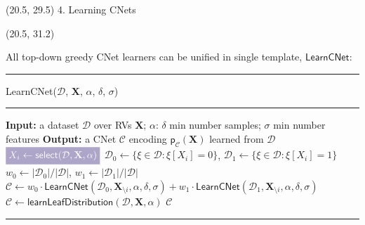 \documentclass[final]{beamer}
\newcommand{\highlight}[2][yellow]{\mathchoice%
  {\colorbox{#1}{\strut\textcolor{white}{$\displaystyle{#2}$}}}%
  {\colorbox{#1}{\strut\textcolor{white}{$\textstyle{#2}$}}}%
  {\colorbox{#1}{\strut\textcolor{white}{$\scriptstyle{#2}$}}}%
  {\colorbox{#1}{\strut\textcolor{white}{$\scriptscriptstyle{#2}$}}}}%
\begin{document}
\begin{frame}{}
  \begin{textblock}{17.5}(20.5, 29.5)
    4. Learning CNets
  \end{textblock}
  
  \begin{textblock}{17.5}(20.5, 31.2)
    \small
    
    All top-down greedy CNet learners %
    can be unified in single template, $\mathsf{LearnCNet}$:
 \begin{center}  
  \begin{minipage}{0.9\linewidth}
    \vspace{10pt}
        \scriptsize
        {\hrule\flushleft\textsf{LearnCNet}($\mathcal{D}$, $\mathbf{X}$, $\alpha$,
        $\delta$, $\sigma$)\\\hrule}
  \begin{algorithmic}[1]
    \State \textbf{Input:} a dataset $\mathcal{D}$ over RVs $\mathbf{X}$; $\alpha$: $\delta$
    min number samples; $\sigma$ min number features
    \State  \textbf{Output:}  a CNet $\mathcal{C}$ encoding  $\mathsf{p}_{\mathcal{C}}(\textbf{X})$ learned from $\mathcal D$
    \State $\highlight[lacamlightlilac]{X_i\leftarrow  \mathsf{select}(\mathcal D, \mathbf X, \alpha)}$
    \State $\mathcal D_0 \leftarrow \{\xi \in \mathcal D: \xi[X_i]=0 \}$, $\mathcal D_1 \leftarrow \{\xi \in \mathcal D: \xi[X_i]=1 \}$
    \State $w_0 \leftarrow |\mathcal D_0| / |\mathcal D|$, $w_1 \leftarrow |\mathcal   D_1| / |\mathcal D|$
    \State $\mathcal{C} \leftarrow
    w_0\cdot\mathsf{LearnCNet}(\mathcal D_0, \mathbf X_{\setminus i},
    \alpha, \delta, \sigma) + w_1 \cdot\mathsf{LearnCNet}(\mathcal D_1, \mathbf X_{\setminus i}, \alpha, \delta, \sigma) $
    \Else 
    \State $\mathcal{C} \leftarrow \mathsf{learnLeafDistribution}(\mathcal D, \mathbf X, \alpha)$
    \EndIf
    \State \Return $\mathcal{C}$
  \end{algorithmic}
  \hrule
  

\end{minipage}
\end{center}
\end{textblock}
\end{frame}
\end{document}
